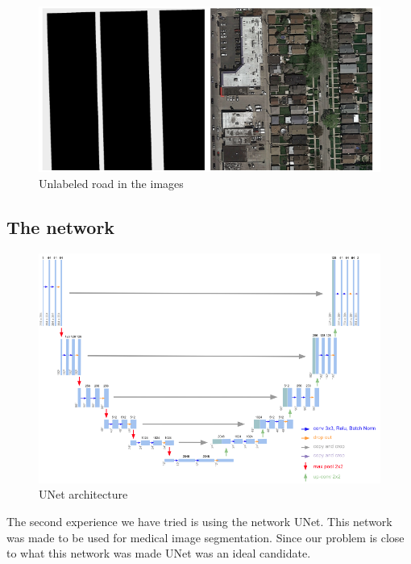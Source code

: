 \documentclass[10pt,conference,compsocconf]{IEEEtran}
\begin{document}
\begin{figure}
  \centering
  \includegraphics[width=\columnwidth]{img/wrongannots.png}
  \caption{Unlabeled road in the images}
  \vspace{-3mm}
  \label{fig:unlabeled}
\end{figure}

\clearpage

\subsection{The network}

\begin{figure}[h]
  \centering
  \includegraphics[width=0.95\columnwidth]{img/unet.png}
  \caption{UNet architecture}
  \label{fig:unet}
\end{figure}

The second experience we have tried is using the network UNet. This network was made to be used for medical image segmentation. Since our problem is close to what this network was made UNet was an ideal candidate.\\
\end{document}
